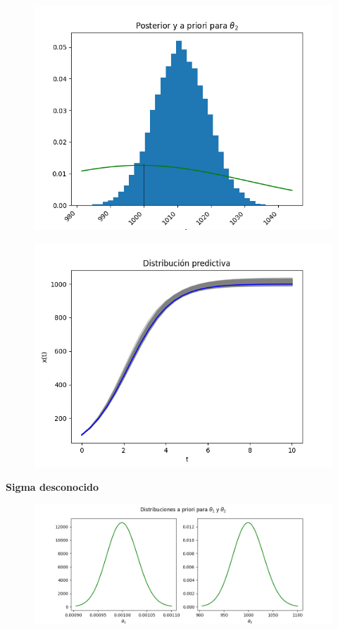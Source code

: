 \begin{figure}[H] 
    \centering 
    \includegraphics[width = 10 cm ]{img/Exp_Central_logistico/Figuras/Generales/Post_theta2_logistico.png} 
\end{figure} 


\begin{figure}[H] 
    \centering 
    \includegraphics[width = 10 cm ]{img/Exp_Central_logistico/Figuras/Generales/Predictiva_logistico.png} 
\end{figure} 


\textbf{Sigma desconocido}




\begin{figure}[H] 
    \centering 
    \includegraphics[width = 15 cm]{img/Exp_Central_logistico_sigma/Figuras/Generales/Apriori_logistico_sigma.png}     
\end{figure} 

